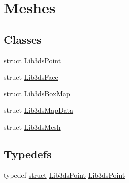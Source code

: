 \hypertarget{group__mesh}{\section{Meshes}
\label{group__mesh}
}
\subsection*{Classes}
\begin{DoxyCompactItemize}
\item 
struct \hyperlink{struct_lib3ds_point}{Lib3ds\-Point}
\item 
struct \hyperlink{struct_lib3ds_face}{Lib3ds\-Face}
\item 
struct \hyperlink{struct_lib3ds_box_map}{Lib3ds\-Box\-Map}
\item 
struct \hyperlink{struct_lib3ds_map_data}{Lib3ds\-Map\-Data}
\item 
struct \hyperlink{struct_lib3ds_mesh}{Lib3ds\-Mesh}
\end{DoxyCompactItemize}
\subsection*{Typedefs}
\begin{DoxyCompactItemize}
\item 
typedef \hyperlink{sdlgamepad_8dox_aba655c5729da86df745f0c8e7f9ba8d2}{struct} \hyperlink{struct_lib3ds_point}{Lib3ds\-Point} \hyperlink{group__mesh_ga6cd59034c5b1363705d3cb07076fea6f}{Lib3ds\-Point}
\end{DoxyCompactItemize}
